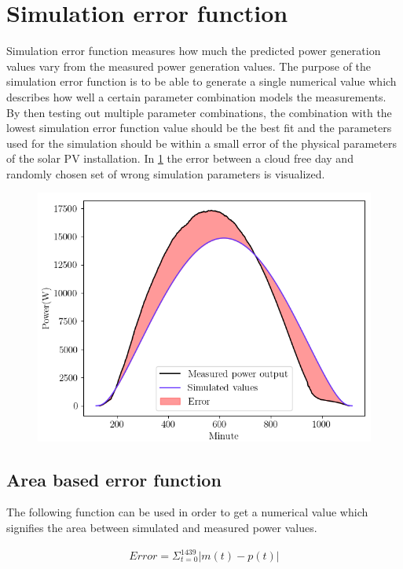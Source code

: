\section{Simulation error function}
\label{section_simulation_error_function}
Simulation error function measures how much the predicted power generation values vary from the measured power generation values. The purpose of the simulation error function is to be able to generate a single numerical value which describes how well a certain parameter combination models the measurements. By then testing out multiple parameter combinations, the combination with the lowest simulation error function value should be the best fit and the parameters used for the simulation should be within a small error of the physical parameters of the solar PV installation. In \ref{fig_error} the error between a cloud free day and randomly chosen set of wrong simulation parameters is visualized.



\begin{figure}[h]
\centering
\includegraphics[width=0.6\linewidth]{pics/error}
\label{fig_error}
\end{figure}



\newpage
\subsection{Area based error function}
The following function can be used in order to get a numerical value which signifies the area between simulated and measured power values. 

\begin{align}
	Error =  \Sigma_{t=0}^{1439} |m(t)-p(t)| \label{areaerror}
\end{align}

